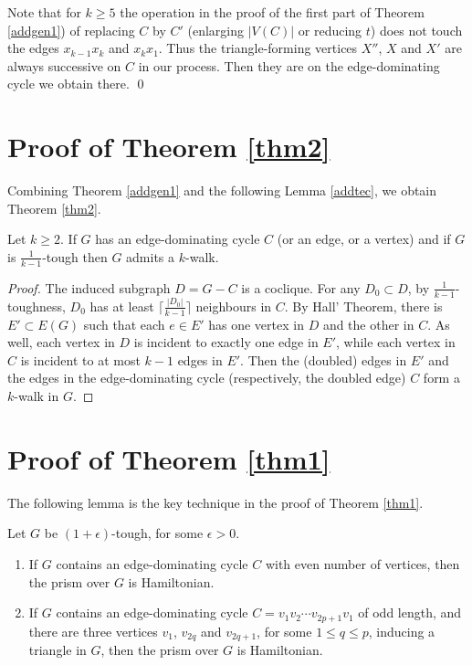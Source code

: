\documentclass[runningheads,a4paper]{llncs}
\begin{document}
Note that for $k\geq 5$ the operation 
in the proof of the first part of Theorem \ref{addgen1}) 
of replacing  $C$ by $C'$ (enlarging $|V(C)|$ or reducing $t$) 
does not touch the edges $x_{k-1}x_k$ and $x_kx_1$. Thus the triangle-forming 
vertices $X''$, $X$ and $X'$ are always successive on $C$ in our process. 
Then they are on the edge-dominating cycle we obtain there.  \qed


\section{Proof of Theorem \ref{thm2}}


Combining Theorem \ref{addgen1} and the following
Lemma \ref{addtec}, we obtain Theorem \ref{thm2}.

\begin{lemma}\label{addtec}
Let $k\geq 2$.
If $G$ has an edge-dominating cycle $C$ (or an edge, or a vertex) 
and if $G$ is $\frac{1}{k-1}$-tough then $G$ admits a $k$-walk.
\end{lemma}
\begin{proof} 
The induced subgraph $D=G-C$ is a coclique. For any
$D_0\subset D$, by $\frac{1}{k-1}$-toughness, $D_0$ has at least
$\lceil\frac{|D_0|}{k-1}\rceil$ neighbours in $C$. By Hall' Theorem, there is
$E'\subset E(G)$ such that each $e\in E'$ has one vertex in $D$ and the other
in $C$. As well, each vertex in $D$ is incident to exactly one edge in $E'$, while
each vertex in $C$ is incident to at most $k-1$ edges in $E'$. Then the
(doubled) edges in $E'$ and the edges in the edge-dominating cycle 
(respectively, the doubled edge) $C$ form a $k$-walk in $G$.  
\end{proof}

%


\section{Proof of Theorem \ref{thm1}}
The following lemma is the key technique in the proof of Theorem \ref{thm1}.
\begin{lemma}\label{keylem}
Let $G$ be $(1+\epsilon)$-tough, for some $\epsilon>0$.
\begin{enumerate}
\item If $G$ contains an edge-dominating cycle $C$ with even number of vertices, then the prism over $G$ is Hamiltonian.
\item If $G$ contains an edge-dominating cycle $C=v_1v_2\cdots v_{2p+1}v_1$ of odd length, and there are three vertices $v_1$, $v_{2q}$ and $v_{2q+1}$, for some $1\le q\le p$, inducing a triangle in $G$, then the prism over $G$ is Hamiltonian.
\end{enumerate}
\end{lemma}
\end{document}
